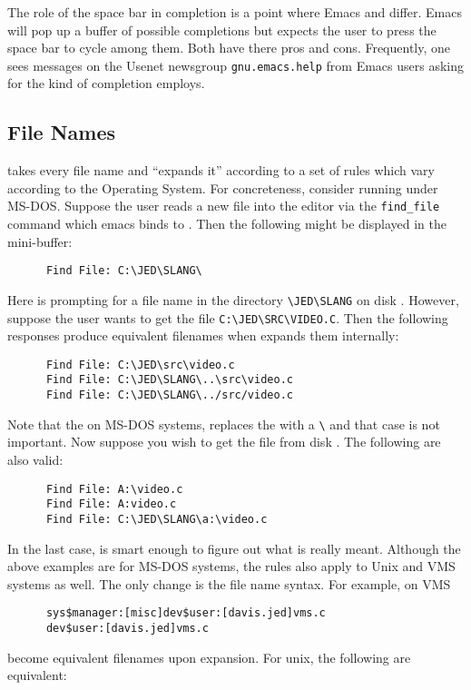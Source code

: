   The role of the space bar in completion is a point where Emacs and \jed{}
  differ. Emacs will pop up a buffer of possible completions but \jed{} expects
  the user to press the space bar to cycle among them.  Both have there pros
  and cons.  Frequently, one sees messages on the Usenet newsgroup
  \verb|gnu.emacs.help| from Emacs users asking for the kind of completion
  \jed{} employs.

\subsection{File Names}

  \jed{} takes every file name and ``expands it'' according to a set of rules
  which vary according to the Operating System.  For concreteness, consider
  \jed{} running under MS-DOS.  Suppose the user reads a new file into the
  editor via the \verb|find_file| command which emacs binds to 
  . Then the following might be displayed in the mini-buffer:

\begin{verbatim}
      Find File: C:\JED\SLANG\
\end{verbatim}


  Here \jed{} is prompting for a file name in the directory \verb|\JED\SLANG|
  on disk \var{C:}. However, suppose the user wants to get the file
  \verb|C:\JED\SRC\VIDEO.C|. Then the following responses produce equivalent
  filenames when \jed{} expands them internally:
\begin{verbatim}
      Find File: C:\JED\src\video.c
      Find File: C:\JED\SLANG\..\src\video.c
      Find File: C:\JED\SLANG\../src/video.c
\end{verbatim}

  Note that the on MS-DOS systems, \jed{} replaces the \var{/} with a \verb|\|
  and that case is not important.  Now suppose you wish to get the file
  \var{VIDEO.C} from disk \var{A:}.  The following are also valid:

\begin{verbatim}
      Find File: A:\video.c
      Find File: A:video.c
      Find File: C:\JED\SLANG\a:\video.c
\end{verbatim}

  In the last case, \jed{} is smart enough to figure out what is really meant.
  Although the above examples are for MS-DOS systems, the rules also apply to
  Unix and VMS systems as well.  The only change is the file name syntax.
  For example, on VMS
\begin{verbatim}
      sys$manager:[misc]dev$user:[davis.jed]vms.c
      dev$user:[davis.jed]vms.c
\end{verbatim} %
  become equivalent filenames upon expansion.  For unix, the following are
  equivalent:

